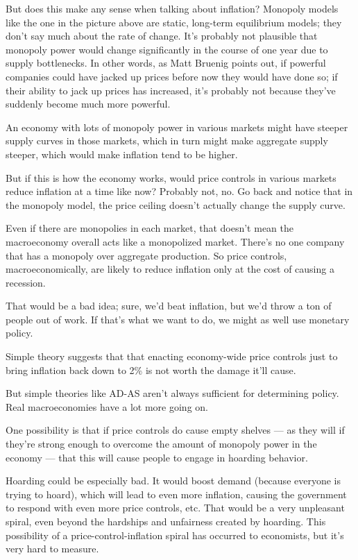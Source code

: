 \documentclass[
]{book}
\begin{document}
But does this make any sense when talking about inflation? Monopoly models like the one in the picture above are static, long-term equilibrium models; they don't say much about the rate of change. It's probably not plausible that monopoly power would change significantly in the course of one year due to supply bottlenecks. In other words, as Matt Bruenig points out, if powerful companies could have jacked up prices before now they would have done so; if their ability to jack up prices has increased, it's probably not because they've suddenly become much more powerful.

\href{fig/price_control_inflation.png}{}

An economy with lots of monopoly power in various markets might have steeper supply curves in those markets, which in turn might make aggregate supply steeper, which would make inflation tend to be higher.

But if this is how the economy works, would price controls in various markets reduce inflation at a time like now? Probably not, no. Go back and notice that in the monopoly model, the price ceiling doesn't actually change the supply curve.

Even if there are monopolies in each market, that doesn't mean the macroeconomy overall acts like a monopolized market. There's no one company that has a monopoly over aggregate production. So price controls, macroeconomically, are likely to reduce inflation only at the cost of causing a recession.

That would be a bad idea; sure, we'd beat inflation, but we'd throw a ton of people out of work. If that's what we want to do, we might as well use monetary policy.

Simple theory suggests that that enacting economy-wide price controls just to bring inflation back down to 2\% is not worth the damage it'll cause.

But simple theories like AD-AS aren't always sufficient for determining policy. Real macroeconomies have a lot more going on.

One possibility is that if price controls do cause empty shelves --- as they will if they're strong enough to overcome the amount of monopoly power in the economy --- that this will cause people to engage in hoarding behavior.

Hoarding could be especially bad. It would boost demand (because everyone is trying to hoard), which will lead to even more inflation, causing the government to respond with even more price controls, etc. That would be a very unpleasant spiral, even beyond the hardships and unfairness created by hoarding. This possibility of a price-control-inflation spiral has occurred to economists, but it's very hard to measure.
\end{document}
